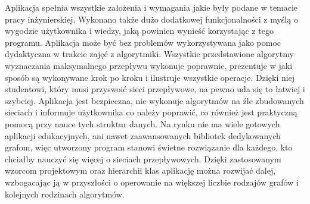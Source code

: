 Aplikacja spełnia wszystkie założenia i wymagania jakie były podane w temacie pracy inżynierskiej. Wykonano także dużo dodatkowej funkcjonalności z myślą o wygodzie użytkownika i wiedzy, jaką powinien wynieść korzystając z tego programu. Aplikacja może być bez problemów wykorzystywana jako pomoc dydaktyczna w trakcie zajęć z algorytmiki. Wszystkie przedstawione algorytmy wyznaczania maksymalnego przepływu wykonuje poprawnie, prezentuje w jaki sposób są wykonywane krok po kroku i ilustruje wszystkie operacje. Dzięki niej studentowi, który musi przyswoić sieci przepływowe, na pewno uda się to łatwiej i szybciej. Aplikacja jest bezpieczna, nie wykonuje algorytmów na źle zbudowanych sieciach i informuje użytkownika co należy poprawić, co również jest praktyczną pomocą przy nauce tych struktur danych. Na rynku nie ma wiele gotowych aplikacji edukacyjnych, ani nawet zaawansowanych bibliotek dedykowanych grafom, więc utworzony program stanowi świetne rozwiązanie dla każdego, kto chciałby nauczyć się więcej o sieciach przepływowych. Dzięki zastosowanym wzorcom projektowym oraz hierarchii klas aplikację można rozwijać dalej, wzbogacając ją w przyszłości o operowanie na większej liczbie rodzajów grafów i kolejnych rodzinach algorytmów.